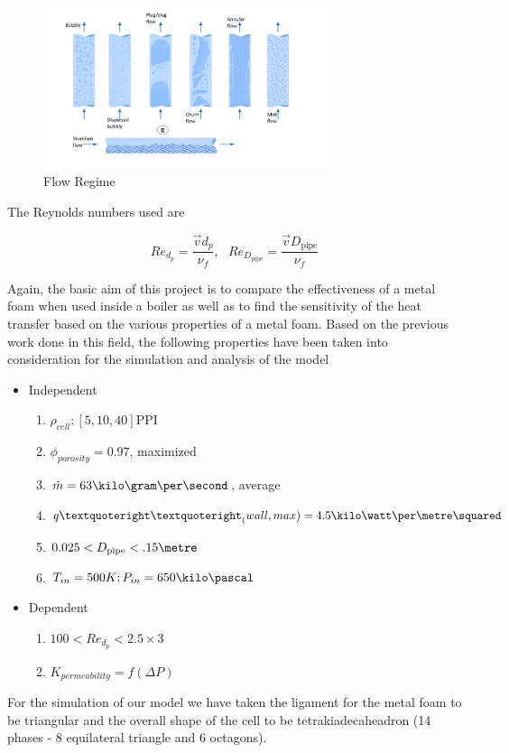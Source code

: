 \documentclass[asme2ejs.tex]{subfiles}
\begin{document}
\begin{figure}[t]
\begin{center}
\includegraphics[width=0.75\textwidth]{./figure/flow_regime}
\end{center}
\caption{Flow Regime}
\label{fig:flowregime}
\end{figure}

The Reynolds numbers used are

\begin{equation}
Re_{d_{p}} = \frac{\vec{v} d_p}{\nu_f}, ~~~ Re_{D_{\mathrm{pipe}}} = \frac{\vec{v} D_{\mathrm{pipe}}}{\nu_f}
\end{equation}

Again, the basic aim of this project is to compare the effectiveness of a metal foam when used inside a boiler as well as to find the sensitivity of the heat transfer based on the various properties of a metal foam. Based on the previous work done in this field, the following properties have been taken into consideration for the simulation and analysis of the model


\begin{itemize}
	\item Independent
		\begin{enumerate}
			\item $\rho_{cell} : [5,10,40] \mathrm{PPI}$
			\item $\phi_{porosity}= 0.97$, maximized
			\item $\dot{m} =63 \kilo\gram\per\second$, average
			\item $ q’’_(wall,max)=4.5 \kilo\watt\per\metre\squared$
			\item $ 0.025 < D_{\mathrm{pipe}} < .15 \metre$
			\item $ T_{in}=500K;P_{in} = 650 \kilo\pascal $
		\end{enumerate}
	\item Dependent
		\begin{enumerate}
			\item $100 < Re_{d_p} < 2.5 \times 3$
			\item $K_{permeability}= f(\Delta P)$
		\end{enumerate}
\end{itemize}

For the simulation of our model we have taken the ligament for the metal foam to be triangular and the overall shape of the cell to be tetrakiadecaheadron (14 phases - 8 equilateral triangle and 6 octagons).
\end{document}
